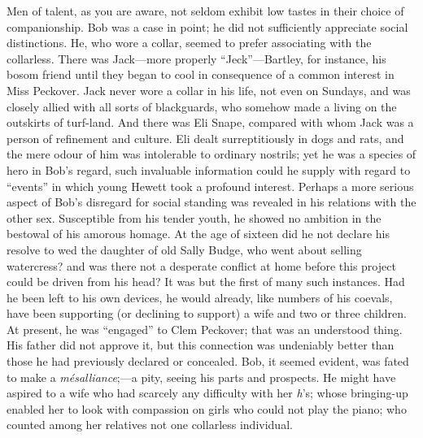 Men of talent, as you are aware, not seldom exhibit low tastes in their
choice of companionship. Bob was a case in point; he did not
sufficiently appreciate social distinctions. He, who wore a collar,
seemed to prefer associating with the collarless. There was Jack---more
properly ``Jeck''---Bartley, for instance, his bosom friend until they
began to cool in consequence of a common interest in Miss Peckover. Jack
never wore a collar {\protect\hypertarget{171}{}{}}in his life, not even
on Sundays, and was closely allied with all sorts of blackguards, who
somehow made a living on the outskirts of turf-land. And there was Eli
Snape, compared with whom Jack was a person of refinement and culture.
Eli dealt surreptitiously in dogs and rats, and the mere odour of him
was intolerable to ordinary nostrils; yet he was a species of hero in
Bob's regard, such invaluable information could he supply with regard to
``events'' in which young Hewett took a profound interest. Perhaps a
more serious aspect of Bob's disregard for social standing was revealed
in his relations with the other sex. Susceptible from his tender youth,
he showed no ambition in the bestowal of his amorous homage. At the age
of sixteen did he not declare his resolve to wed the daughter of old
Sally Budge, who went about selling watercress? and was there not a
desperate conflict at home before this project could be driven from his
head? It was but the first of many such instances. Had he been left to
his own devices, he would {\protect\hypertarget{172}{}{}}already, like
numbers of his coevals, have been supporting (or declining to support) a
wife and two or three children. At present, he was ``engaged'' to Clem
Peckover; that was an understood thing. His father did not approve it,
but this connection was undeniably better than those he had previously
declared or concealed. Bob, it seemed evident, was fated to make a
\emph{mésalliance};---a pity, seeing his parts and prospects. He might
have aspired to a wife who had scarcely any difficulty with her
\emph{h}'s; whose bringing-up enabled her to look with compassion on
girls who could not play the piano; who counted among her relatives not
one collarless individual.

